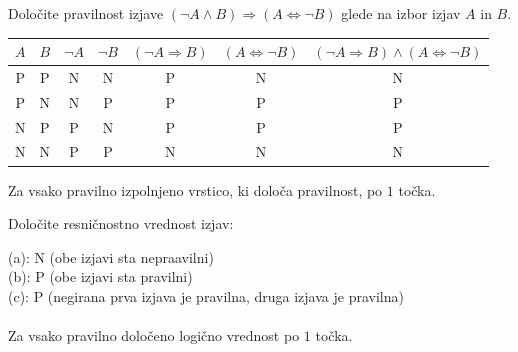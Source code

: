 \documentclass[addpoints,11pt]{exam}
\begin{document}
\begin{questions}

    
    \question[4]
    Določite pravilnost izjave $(\lnot A \land  B)\Rightarrow (A\Leftrightarrow \lnot B)$ glede na izbor izjav $A$ in $B$.

    \begin{solution}[10cm]
        \begin{table}[H]
            \begin{tabular}{ccccccc}
             $A$ & $B$ & $\lnot A$ & $\lnot B$ & $(\lnot A\Rightarrow B)$ & $(A\Leftrightarrow \lnot B)$ & $(\lnot A\Rightarrow B)\land(A\Leftrightarrow \lnot B)$\\ \hline
             P & P & N & N & P & N & N \\ 
             P & N & N & P & P & P & P \\
             N & P & P & N & P & P & P \\
             N & N & P & P & N & N & N
            \end{tabular}
        \end{table}
        Za vsako pravilno izpolnjeno vrstico, ki določa pravilnost, po $1$ točka.
    \end{solution}


\newpage

    \question[3]
    Določite resničnostno vrednost izjav:

    \begin{solution}
        (a): N (obe izjavi sta nepraavilni) \\
        (b): P (obe izjavi sta pravilni) \\
        (c): P (negirana prva izjava je pravilna, druga izjava je pravilna) \\ \\
        Za vsako pravilno določeno logično vrednost po $1$ točka.
    \end{solution}




\end{questions}
\end{document}
